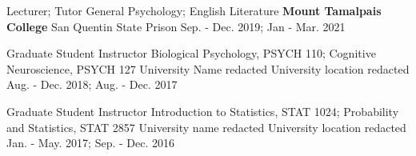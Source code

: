 

\begin{cventries}

  \cventry
    {Lecturer; Tutor} %
    {General Psychology; English Literature} %
    {\textbf{Mount Tamalpais College}} %
    {San Quentin State Prison} %
    {Sep. - Dec. 2019; Jan - Mar. 2021} %
    
  \cventry
	{Graduate Student Instructor} %
	{Biological Psychology, PSYCH 110; Cognitive Neuroscience, PSYCH 127} %
    {University Name redacted} %
    {University location redacted} %
    {Aug. - Dec. 2018; Aug. - Dec. 2017} %
    
  \cventry
	{Graduate Student Instructor} %
	{Introduction to Statistics, STAT 1024; Probability and Statistics, STAT 2857} %
    {University name redacted} %
    {University location redacted} %
    {Jan. - May. 2017; Sep. - Dec. 2016 } %
    
\end{cventries}
